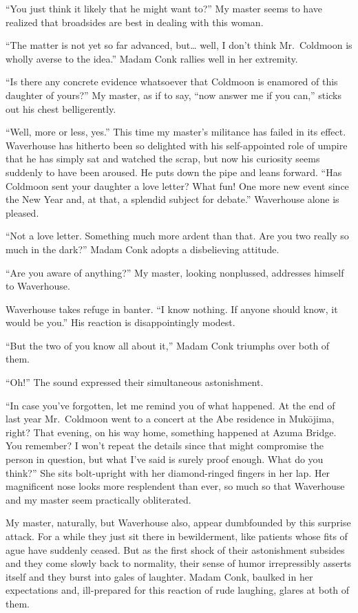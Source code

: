 \documentclass[12pt, openright]{book}
\begin{document}
``You just think it likely that he might want to?'' My master seems to
have realized that broadsides are best in dealing with this woman.

``The matter is not yet so far advanced, but\ldots{} well, I don't think
Mr.~Coldmoon is wholly averse to the idea.'' Madam Conk rallies well in
her extremity.

``Is there any concrete evidence whatsoever that Coldmoon is enamored of
this daughter of yours?'' My master, as if to say, ``now answer me if
you can,'' sticks out his chest belligerently.

``Well, more or less, yes.'' This time my master's militance has failed
in its effect. Waverhouse has hitherto been so delighted with his
self-appointed role of umpire that he has simply sat and watched the
scrap, but now his curiosity seems suddenly to have been aroused. He
puts down the pipe and leans forward. ``Has Coldmoon sent your daughter
a love letter? What fun! One more new event since the New Year and, at
that, a splendid subject for debate.'' Waverhouse alone is pleased.

``Not a love letter. Something much more ardent than that. Are you two
really so much in the dark?'' Madam Conk adopts a disbelieving attitude.

``Are you aware of anything?'' My master, looking nonplussed, addresses
himself to Waverhouse.

Waverhouse takes refuge in banter. ``I know nothing. If anyone should
know, it would be you.'' His reaction is disappointingly modest.

``But the two of you know all about it,'' Madam Conk triumphs over both
of them.

``Oh!'' The sound expressed their simultaneous astonishment.

``In case you've forgotten, let me remind you of what happened. At the
end of last year Mr.~Coldmoon went to a concert at the Abe residence in
Mukōjima, right? That evening, on his way home, something happened at
Azuma Bridge. You remember? I won't repeat the details since that might
compromise the person in question, but what I've said is surely proof
enough. What do you think?'' She sits bolt-upright with her
diamond-ringed fingers in her lap. Her magnificent nose looks more
resplendent than ever, so much so that Waverhouse and my master seem
practically obliterated.

My master, naturally, but Waverhouse also, appear dumbfounded by this
surprise attack. For a while they just sit there in bewilderment, like
patients whose fits of ague have suddenly ceased. But as the first shock
of their astonishment subsides and they come slowly back to normality,
their sense of humor irrepressibly asserts itself and they burst into
gales of laughter. Madam Conk, baulked in her expectations and,
ill-prepared for this reaction of rude laughing, glares at both of them.
\end{document}
